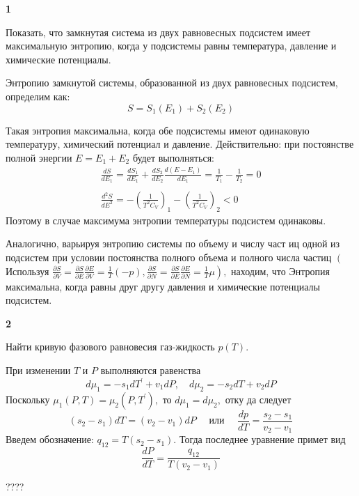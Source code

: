 \documentclass[a4paper,12pt]{article} %
\begin{document}
\begin{ttask}\textbf{1}


Показать, что замкнутая система из двух равновесных подсистем имеет максимальную энтропию, 
когда у подсистемы равны температура, давление и химические потенциалы.


Энтропию замкнутой системы, образованной из двух равновесных подсистем, определим как:
$$
S=S_{1}\left(E_{1}\right)+S_{2}\left(E_{2}\right)
$$


Такая энтропия максимальна, когда обе подсистемы имеют одинаковую температуру, химический потенциал и давление.
Действительно:
при постоянстве полной энергии $E=E_{1}+E_{2}$ будет выполняться:
{\Large $$
	\begin{array}{c}
	\frac{d S}{d E_{1}}=\frac{d S_{1}}{d E_{1}}+\frac{d S_{2}}{d E_{2}} \frac{d\left(E-E_{1}\right)}{d E_{1}}=\frac{1}{T_{1}}-\frac{1}{T_{2}}=0 \\ \\
	\frac{d^{2} S}{d E^{2}}=-\left(\frac{1}{T^{2} C_{V}}\right)_{1}-\left(\frac{1}{T^{2} C_{V}}\right)_{2}<0
	\end{array}
	$$}
Поэтому в случае максимума энтропии температуры подсистем одинаковы.

Аналогично, варьируя энтропию системы по объему и числу част иц одной из подсистем при условии постоянства полного объема и полного числа частиц 
$\left(\right.$ Используя $\left.\frac{\partial S}{\partial V}=
\frac{\partial S}{\partial E} \frac{\partial E}{\partial V}=\frac{1}{T}(-p), \frac{\partial S}{\partial N}=
\frac{\partial S}{\partial E} \frac{\partial E}{\partial N}=
\frac{1}{T} \mu\right),$ находим, что Энтропия
максимальна, когда равны друг другу давления и химические потенциалы подсистем.



\end{ttask}


\begin{ttask} \textbf{2}

Найти кривую фазового равновесия газ-жидкость $ p(T) $.


При изменении $T$ и $P$ выполняются равенства
$$
d \mu_{1}=-s_{1} d T^{\prime}+v_{1} d P, \quad d \mu_{2}=-s_{2} d T+v_{2} d P
$$
Поскольку $\mu_{1}(P, T)=\mu_{2}\left(P, T^{\prime}\right),$ то $d \mu_{1}=d \mu_{2},$ отку да следует
$$
\left(s_{2}-s_{1}\right) d T=\left(v_{2}-v_{1}\right) d P \quad \text { или } \quad \frac{d p}{d T}=\frac{s_{2}-s_{1}}{v_{2}-v_{1}}
$$
Введем обозначение: $q_{12}=T\left(s_{2}-s_{1}\right) .$ Тогда последнее уравнение примет вид
$$
\frac{d P}{d T}=
\frac{q_{12}}{T\left(v_{2}-v_{1}\right)}
$$


????



\end{ttask}
\end{document}

